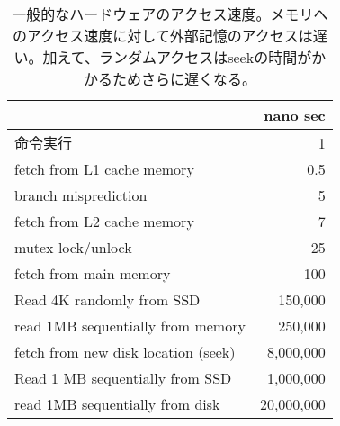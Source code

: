 \begin{table}
\centering
\caption{一般的なハードウェアのアクセス速度。メモリへのアクセス速度に対して外部記憶のアクセスは遅い。加えて、ランダムアクセスはseekの時間がかかるためさらに遅くなる。 }
\label{tbl:latency}
\begin{tabular}{|l|r|}
		   & nano sec \\ \hline
	命令実行 & 1 \\
	fetch from L1 cache memory & 0.5 \\
	branch misprediction 		& 5 \\
	fetch from L2 cache memory & 7 \\
	mutex lock/unlock  			& 25 \\
	fetch from main memory  	& 100 \\
	Read 4K randomly from SSD         & 150,000 \\
	read 1MB sequentially from memory & 250,000 \\
	fetch from new disk location (seek) & 8,000,000 \\
	Read 1 MB sequentially from SSD		& 1,000,000 \\
	read 1MB sequentially from disk 	& 20,000,000 \\
	
\end{tabular}
\end{table}

